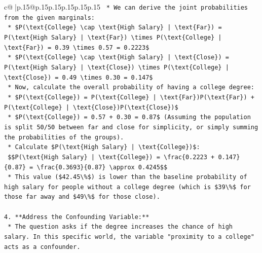 \documentclass{article}
\begin{document}
{\begin{supertabular}{c@{$\;$}|p{.15\linewidth}@{}p{.15\linewidth}p{.15\linewidth}p{.15\linewidth}p{.15\linewidth}p{.15\linewidth}}
{{{\texttt{    *   We can derive the joint probabilities from the given marginals:} \\
\texttt{        *   \$P(\textbackslash{}text\{College\} \textbackslash{}cap \textbackslash{}text\{High Salary\} | \textbackslash{}text\{Far\}) = P(\textbackslash{}text\{High Salary\} | \textbackslash{}text\{Far\}) \textbackslash{}times P(\textbackslash{}text\{College\} | \textbackslash{}text\{Far\}) = 0.39 \textbackslash{}times 0.57 = 0.2223\$} \\
\texttt{        *   \$P(\textbackslash{}text\{College\} \textbackslash{}cap \textbackslash{}text\{High Salary\} | \textbackslash{}text\{Close\}) = P(\textbackslash{}text\{High Salary\} | \textbackslash{}text\{Close\}) \textbackslash{}times P(\textbackslash{}text\{College\} | \textbackslash{}text\{Close\}) = 0.49 \textbackslash{}times 0.30 = 0.147\$} \\
\texttt{    *   Now, calculate the overall probability of having a college degree:} \\
\texttt{        *   \$P(\textbackslash{}text\{College\}) = P(\textbackslash{}text\{College\} | \textbackslash{}text\{Far\})P(\textbackslash{}text\{Far\}) + P(\textbackslash{}text\{College\} | \textbackslash{}text\{Close\})P(\textbackslash{}text\{Close\})\$} \\
\texttt{        *   \$P(\textbackslash{}text\{College\}) = 0.57 + 0.30 = 0.87\$ (Assuming the population is split 50/50 between far and close for simplicity, or simply summing the probabilities of the groups).} \\
\texttt{    *   Calculate \$P(\textbackslash{}text\{High Salary\} | \textbackslash{}text\{College\})\$:} \\
\texttt{        \$\$P(\textbackslash{}text\{High Salary\} | \textbackslash{}text\{College\}) = \textbackslash{}frac\{0.2223 + 0.147\}\{0.87\} = \textbackslash{}frac\{0.3693\}\{0.87\} \textbackslash{}approx 0.4245\$\$} \\
\texttt{    *   This value (\$42.45\textbackslash{}\%\$) is lower than the baseline probability of high salary for people without a college degree (which is \$39\textbackslash{}\%\$ for those far away and \$49\textbackslash{}\%\$ for those close).} \\
\\ 
\texttt{4.  **Address the Confounding Variable:**} \\
\texttt{    *   The question asks if the degree increases the chance of high salary. In this specific world, the variable "proximity to a college" acts as a confounder.} \\
}}}
\end{supertabular}}
\end{document}
